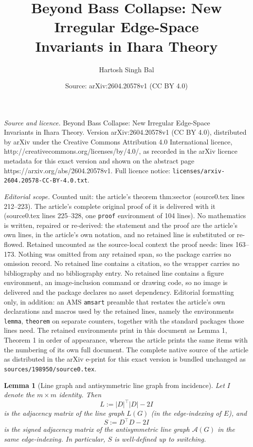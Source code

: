 \documentclass[10pt,a4paper]{amsart}
\title{Beyond Bass Collapse: New Irregular Edge-Space\\ Invariants in Ihara Theory}
\author{Hartosh Singh Bal}
\date{Source: arXiv:2604.20578v1 (CC BY 4.0)}
\newtheorem{lemma}{Lemma}
\begin{document}
\maketitle

\noindent\emph{Source and licence.} Beyond Bass Collapse: New Irregular Edge-Space\\ Invariants in Ihara Theory. Version arXiv:2604.20578v1 (CC BY 4.0), distributed by arXiv under the Creative Commons Attribution 4.0 International licence, http://creativecommons.org/licenses/by/4.0/, as recorded in the arXiv licence metadata for this exact version and shown on the abstract page https://arxiv.org/abs/2604.20578v1. Full licence notice: \texttt{licenses/arxiv-2604.20578-CC-BY-4.0.txt}.\par\smallskip

\noindent\textit{Editorial scope.} Counted unit: the article's theorem thm:sector (source0.tex lines 212--223). The article's complete original proof of it is delivered with it (source0.tex lines 225--328, one \texttt{proof} environment of 104 lines). No mathematics is written, repaired or re-derived: the statement and the proof are the article's own lines, in the article's own notation, and no retained line is substituted or re-flowed.  Retained uncounted as the source-local context the proof needs: lines 163--173.  Nothing was omitted from any retained span, so the package carries no omission record.  No retained line contains a citation, so the wrapper carries no bibliography and no bibliography entry.  No retained line contains a figure environment, an image-inclusion command or drawing code, so no image is delivered and the package declares no asset dependency.  Editorial formatting only, in addition: an AMS \texttt{amsart} preamble that restates the article's own declarations and macros used by the retained lines, namely the environments \texttt{lemma}, \texttt{theorem} on separate counters, together with the standard packages those lines need.  The retained environments print in this document as Lemma 1, Theorem 1 in order of appearance, whereas the article prints the same items with the numbering of its own full document.  The complete native source of the article as distributed in the arXiv e-print for this exact version is bundled unchanged as \texttt{sources/198950/source0.tex}.
\begin{lemma}[Line graph and antisymmetric line graph from incidence]\label{lem:LSfrominc}
Let $I$ denote the $m\times m$ identity. Then
\[
L := |D|^\top|D| - 2I
\]
is the adjacency matrix of the line graph $L(G)$ (in the edge-indexing of $E$), and
\[
S := D^\top D - 2I
\]
is the signed adjacency matrix of the antisymmetric line graph $\mathcal A(G)$ in the same edge-indexing. In particular, $S$ is well-defined up to switching.
\end{lemma}
\end{document}
